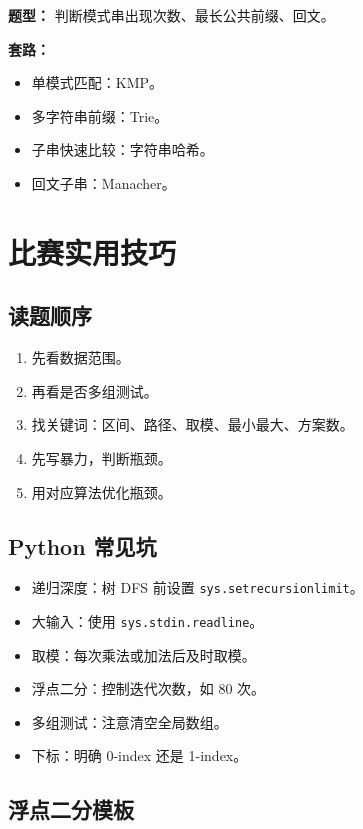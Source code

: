 \documentclass[UTF8,a4paper,14pt]{ctexart}
\begin{document}
\textbf{题型：}
判断模式串出现次数、最长公共前缀、回文。

\textbf{套路：}
\begin{itemize}
  \item 单模式匹配：KMP。
  \item 多字符串前缀：Trie。
  \item 子串快速比较：字符串哈希。
  \item 回文子串：Manacher。
\end{itemize}

\section{比赛实用技巧}

\subsection{读题顺序}

\begin{enumerate}
  \item 先看数据范围。
  \item 再看是否多组测试。
  \item 找关键词：区间、路径、取模、最小最大、方案数。
  \item 先写暴力，判断瓶颈。
  \item 用对应算法优化瓶颈。
\end{enumerate}

\subsection{Python 常见坑}

\begin{itemize}
  \item 递归深度：树 DFS 前设置 \texttt{sys.setrecursionlimit}。
  \item 大输入：使用 \texttt{sys.stdin.readline}。
  \item 取模：每次乘法或加法后及时取模。
  \item 浮点二分：控制迭代次数，如 80 次。
  \item 多组测试：注意清空全局数组。
  \item 下标：明确 0-index 还是 1-index。
\end{itemize}

\subsection{浮点二分模板}
\end{document}
